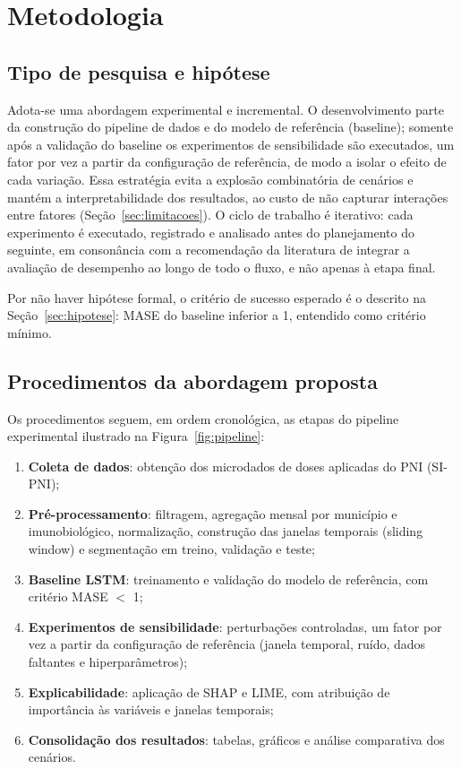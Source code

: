 \documentclass[
    12pt,
    openright,
    oneside,
    a4paper,
    english,
    brazil
]{abntex2}
\begin{document}
\chapter{Metodologia}
\label{cap:metodologia}

\section{Tipo de pesquisa e hipótese}

Adota-se uma abordagem experimental e incremental. O desenvolvimento parte da construção do pipeline de dados e do modelo de referência (baseline); somente após a validação do baseline os experimentos de sensibilidade são executados, um fator por vez a partir da configuração de referência, de modo a isolar o efeito de cada variação. Essa estratégia evita a explosão combinatória de cenários e mantém a interpretabilidade dos resultados, ao custo de não capturar interações entre fatores (Seção~\ref{sec:limitacoes}). O ciclo de trabalho é iterativo: cada experimento é executado, registrado e analisado antes do planejamento do seguinte, em consonância com a recomendação da literatura de integrar a avaliação de desempenho ao longo de todo o fluxo, e não apenas à etapa final.

Por não haver hipótese formal, o critério de sucesso esperado é o descrito na Seção~\ref{sec:hipotese}: MASE do baseline inferior a 1, entendido como critério mínimo.

\section{Procedimentos da abordagem proposta}
\label{sec:procedimentos}

Os procedimentos seguem, em ordem cronológica, as etapas do pipeline experimental ilustrado na Figura~\ref{fig:pipeline}:

\begin{enumerate}
    \item \textbf{Coleta de dados}: obtenção dos microdados de doses aplicadas do PNI (SI-PNI);
    \item \textbf{Pré-processamento}: filtragem, agregação mensal por município e imunobiológico, normalização, construção das janelas temporais (sliding window) e segmentação em treino, validação e teste;
    \item \textbf{Baseline LSTM}: treinamento e validação do modelo de referência, com critério MASE $<$ 1;
    \item \textbf{Experimentos de sensibilidade}: perturbações controladas, um fator por vez a partir da configuração de referência (janela temporal, ruído, dados faltantes e hiperparâmetros);
    \item \textbf{Explicabilidade}: aplicação de SHAP e LIME, com atribuição de importância às variáveis e janelas temporais;
    \item \textbf{Consolidação dos resultados}: tabelas, gráficos e análise comparativa dos cenários.
\end{enumerate}
\end{document}
